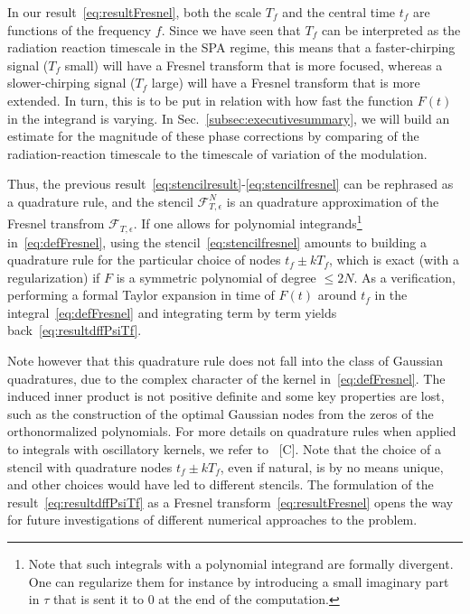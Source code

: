 \documentclass[aps,showpacs,twocolumn,
prd,superscriptaddress,nofootinbib]{revtex4-1}
\newcommand\calF{{\mathcal{F}}}
\newcommand{\tf}{t_{f}}
\newcommand{\Tf}{T_{f}}
\newcommand{\SM}[1]{{\color{Red} #1}}
\begin{document}
In our result~\eqref{eq:resultFresnel}, both the scale $\Tf$ and the central time $\tf$ are functions of the frequency $f$. Since we have seen that $\Tf$ can be interpreted as the radiation reaction timescale in the SPA regime, this means that a faster-chirping signal ($\Tf$ small) will have a Fresnel transform that is more focused, whereas a slower-chirping signal ($\Tf$ large) will have a Fresnel transform that is more extended. In turn, this is to be put in relation with how fast the function $F(t)$ in the integrand is varying. In Sec.~\ref{subsec:executivesummary}, we will build an estimate for the magnitude of these phase corrections by comparing of the radiation-reaction timescale to the timescale of variation of the modulation.

Thus, the previous result~\eqref{eq:stencilresult}-\eqref{eq:stencilfresnel} can be rephrased as a quadrature rule, and the stencil $\calF_{T, \epsilon}^{N}$ is an quadrature approximation of the Fresnel transfrom $\calF_{T, \epsilon}$. If one allows for polynomial integrands\footnote{Note that such integrals with a polynomial integrand are formally divergent. One can regularize them for instance by introducing a small imaginary part in $\tau$ that is sent it to $0$ at the end of the computation.} in~\eqref{eq:defFresnel}, using the stencil~\eqref{eq:stencilfresnel} amounts to building a quadrature rule for the particular choice of nodes $\tf \pm k \Tf$, which is exact (with a regularization) if $F$ is a symmetric polynomial of degree $\leq 2N$. As a verification, performing a formal Taylor expansion in time of $F(t)$ around $\tf$ in the integral~\eqref{eq:defFresnel} and integrating term by term yields back~\eqref{eq:resultdffPsiTf}.

Note however that this quadrature rule does not fall into the class of Gaussian quadratures, due to the complex character of the kernel in~\eqref{eq:defFresnel}. The induced inner product is not positive definite and some key properties are lost, such as the construction of the optimal Gaussian nodes from the zeros of the orthonormalized polynomials. For more details on quadrature rules when applied to integrals with oscillatory kernels, we refer to~\cite{} \SM{[C]}. Note that the choice of a stencil with quadrature nodes $\tf \pm k\Tf$, even if natural, is by no means unique, and other choices would have led to different stencils. The formulation of the result~\eqref{eq:resultdffPsiTf} as a Fresnel transform~\eqref{eq:resultFresnel} opens the way for future investigations of different numerical approaches to the problem.
\end{document}
